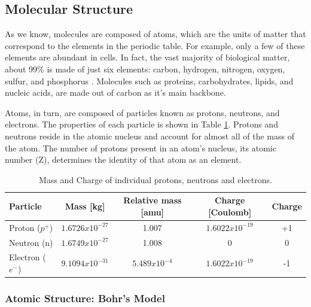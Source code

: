 
\subsection{Molecular Structure}\label{subsec:molecular_structure}

As we know, molecules are composed of atoms, which are the units of matter that correspond to the elements in the periodic table. For example, only a few of these elements are abundant in cells. In fact, the vast majority of biological matter, about 99\% is made of just six elements: carbon, hydrogen, nitrogen, oxygen, sulfur, and phosphorus \cite{museums1992introduction}. Molecules such as proteins, carbohydrates, lipids, and nucleic acids, are made out of carbon as it's main backbone.\par

Atoms, in turn, are composed of particles known as protons, neutrons, and electrons. The properties of each particle is shown in Table \ref{table:massandcharge}. Protons and neutrons reside in the atomic nucleus and account for almost all of the mass of the atom. The number of protons present in an atom’s nucleus, its atomic number (Z), determines the identity of that atom as an element. 

\par\par

\begin{table}[th] %
    \centering
    \begin{tabular}{l|c|c|c|c}
    \toprule
    Particle            &   Mass [kg]       &   Relative mass [amu] &   Charge [Coulomb]    &   Charge\\
    \midrule
    Proton ($p^{+}$)      &   $1.6726x10^{-27}$ &   1.007                &   $1.6022x10^{-19}$     &   +1\\
    Neutron (n)         &   $1.6749x10^{-27}$ &   1.008                  &   0                   &   0\\
    Electron ($e^{-}$)    &   $9.1094x10^{-31}$ &   $5.489x10^{-4}$       &   $1.6022x10^{-19}$     &   -1\\
    \bottomrule
    \end{tabular}
    \caption{Mass and Charge of individual protons, neutrons and electrons.}
    \label{table:massandcharge}
\end{table}     

\subsubsection{Atomic Structure: Bohr's Model}


